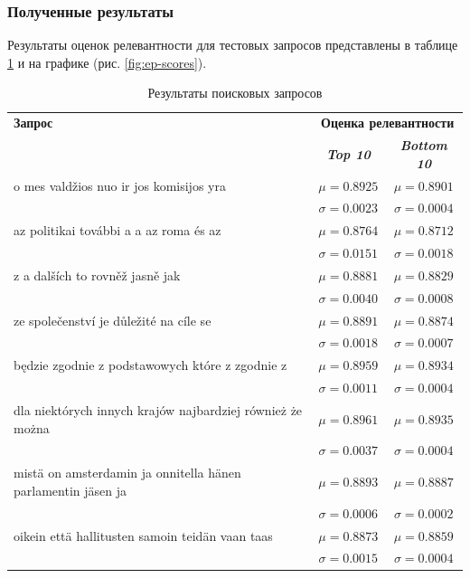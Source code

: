 \subsubsection{Полученные результаты}
Результаты оценок релевантности для тестовых запросов представлены в таблице \ref{tab8} и на графике (рис. \ref{fig:ep-scores}).

\begin{table}[tbp]
    \caption{Результаты поисковых запросов}
    \begin{center}
    \begin{tabular}{m{80mm}cc}
    \toprule
    \textbf{Запрос}&\multicolumn{2}{c}{\textbf{Оценка релевантности}} \\
    & \textbf{\textit{Top 10}}& \textbf{\textit{Bottom 10}} \\
    \midrule
    o mes   valdžios nuo ir  jos komisijos yra& \(\mu=0.8925\) & \(\mu=0.8901\) \\
    & \(\sigma=0.0023\) & \(\sigma=0.0004\) \\
    \midrule
    az politikai további a  a az roma és az& \(\mu=0.8764\) & \(\mu=0.8712\) \\
    & \(\sigma=0.0151\) & \(\sigma=0.0018\) \\
    \midrule
    z a dalších  to rovněž jasně   jak& \(\mu=0.8881\) & \(\mu=0.8829\) \\
    & \(\sigma=0.0040\) & \(\sigma=0.0008\) \\
    \midrule
    ze společenství  je důležité na cíle  se& \(\mu=0.8891\) & \(\mu=0.8874\) \\
    & \(\sigma=0.0018\) & \(\sigma=0.0007\) \\
    \midrule
    będzie zgodnie z podstawowych  które z zgodnie z & \(\mu=0.8959\) & \(\mu=0.8934\) \\
    & \(\sigma=0.0011\) & \(\sigma=0.0004\) \\
    \midrule
    dla niektórych innych krajów najbardziej  również  że można & \(\mu=0.8961\) & \(\mu=0.8935\) \\
    & \(\sigma=0.0037\) & \(\sigma=0.0004\) \\
    \midrule
    mistä on amsterdamin ja onnitella hänen parlamentin jäsen ja & \(\mu=0.8893\) & \(\mu=0.8887\) \\
    & \(\sigma=0.0006\) & \(\sigma=0.0002\) \\
    \midrule
    oikein  että hallitusten samoin   teidän  vaan taas & \(\mu=0.8873\) & \(\mu=0.8859\) \\
    & \(\sigma=0.0015\) & \(\sigma=0.0004\) \\
    \bottomrule
    \end{tabular}\label{tab8}
    \end{center}
\end{table}

